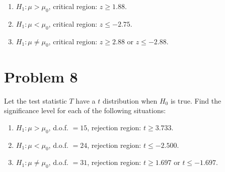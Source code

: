 \documentclass[11pt,twoside]{article}
\numberwithin{equation}{section}
\newcommand{\?}{\stackrel{?}{=}}
\begin{document}
\begin{enumerate}[\bf (a)]
\item $H_1: \mu > \mu_0$, critical region: $z \ge 1.88$.
  \vspace{36ex}

\item $H_1: \mu < \mu_0$, critical region: $z \le -2.75$.
  \vspace{36ex}

\item $H_1: \mu \ne \mu_0$, critical region: $z \ge 2.88$ or $z \le -2.88$.
 \vspace{36ex}

\end{enumerate}

\eject
\section*{Problem 8       }
Let the test statistic $T$ have a $t$ distribution when $H_0$ is true.
Find the significance level for each of the following situations:
\begin{enumerate}[\bf (a)]
\item $H_1: \mu > \mu_0$, d.o.f. $=15$, rejection region: $t \ge 3.733$.
\vspace{36ex}

\item $H_1: \mu < \mu_0$, d.o.f. $=24$, rejection region: $t \le -2.500$.
\vspace{36ex}

\item $H_1: \mu \ne \mu_0$, d.o.f. $=31$, rejection region: $t \ge 1.697$ or $t \le -1.697$.
\vspace{36ex}

\end{enumerate}



\eject
\end{document}
